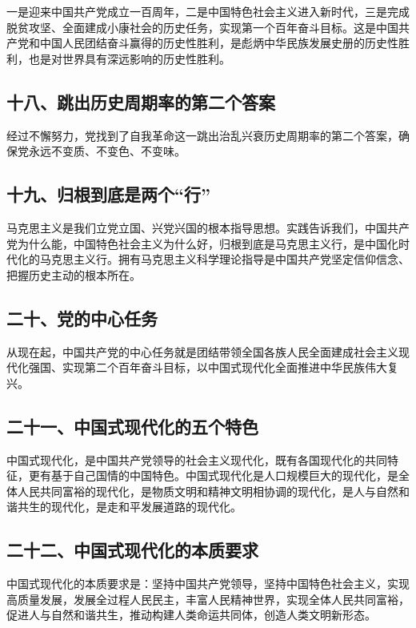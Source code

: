 \documentclass[UTF8,11pt,a4paper]{ctexart}
\begin{document}
一是迎来中国共产党成立一百周年，二是中国特色社会主义进入新时代，三是完成脱贫攻坚、全面建成小康社会的历史任务，实现第一个百年奋斗目标。这是中国共产党和中国人民团结奋斗赢得的历史性胜利，是彪炳中华民族发展史册的历史性胜利，也是对世界具有深远影响的历史性胜利。

\subsection*{十八、跳出历史周期率的第二个答案}

经过不懈努力，党找到了自我革命这一跳出治乱兴衰历史周期率的第二个答案，确保党永远不变质、不变色、不变味。

\subsection*{十九、归根到底是两个“行”}

马克思主义是我们立党立国、兴党兴国的根本指导思想。实践告诉我们，中国共产党为什么能，中国特色社会主义为什么好，归根到底是马克思主义行，是中国化时代化的马克思主义行。拥有马克思主义科学理论指导是中国共产党坚定信仰信念、把握历史主动的根本所在。

\subsection*{二十、党的中心任务}

从现在起，中国共产党的中心任务就是团结带领全国各族人民全面建成社会主义现代化强国、实现第二个百年奋斗目标，以中国式现代化全面推进中华民族伟大复兴。

\subsection*{二十一、中国式现代化的五个特色}

中国式现代化，是中国共产党领导的社会主义现代化，既有各国现代化的共同特征，更有基于自己国情的中国特色。中国式现代化是人口规模巨大的现代化，是全体人民共同富裕的现代化，是物质文明和精神文明相协调的现代化，是人与自然和谐共生的现代化，是走和平发展道路的现代化。

\subsection*{二十二、中国式现代化的本质要求}

中国式现代化的本质要求是：坚持中国共产党领导，坚持中国特色社会主义，实现高质量发展，发展全过程人民民主，丰富人民精神世界，实现全体人民共同富裕，促进人与自然和谐共生，推动构建人类命运共同体，创造人类文明新形态。
\end{document}
